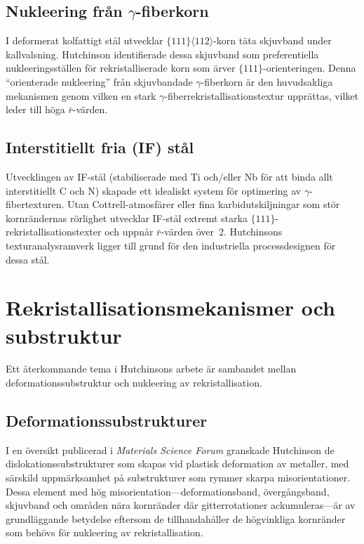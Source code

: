 \documentclass[11pt,a4paper]{article}
\begin{document}
\subsection{Nukleering fr\aa{}n $\gamma$-fiberkorn}

I deformerat kolfattigt st\aa{}l utvecklar
$\{111\}\langle 112\rangle$-korn t\"ata skjuvband under kallvalsning.
Hutchinson identifierade dessa skjuvband som preferentiella
nukleeringsst\"allen f\"or rekristalliserade korn som \"arver
$\{111\}$-orienteringen.  Denna ``orienterade nukleering'' fr\aa{}n
skjuvbandade $\gamma$-fiberkorn \"ar den huvudsakliga mekanismen genom
vilken en stark $\gamma$-fiberrekristallisationstextur uppr\"attas, vilket
leder till h\"oga $\bar{r}$-v\"arden.

\subsection{Interstitiellt fria (IF) st\aa{}l}

Utvecklingen av IF-st\aa{}l (stabiliserade med Ti och/eller Nb f\"or att
binda allt interstitiellt C och N) skapade ett idealiskt system f\"or
optimering av $\gamma$-fibertexturen.  Utan Cottrell-atmosf\"arer eller
fina karbidutskiljningar som st\"or kornr\"andernas r\"orlighet utvecklar
IF-st\aa{}l extremt starka $\{111\}$-rekristallisationstexter och
uppn\aa{}r $\bar{r}$-v\"arden \"over~2.  Hutchinsons texturanalys\-ramverk
ligger till grund f\"or den industriella processdesignen f\"or dessa
st\aa{}l.

\section{Rekristallisationsmekanismer och substruktur}
\label{sec:rex}

Ett \aa{}terkommande tema i Hutchinsons arbete \"ar sambandet mellan
deformationssubstruktur och nukleering av rekristallisation.

\subsection{Deformationssubstrukturer}

I en \"oversikt publicerad i \emph{Materials Science Forum}
\cite{Hutchinson2007MSF} granskade Hutchinson de dislokationssubstrukturer
som skapas vid plastisk deformation av metaller, med s\"arskild
uppm\"arksamhet p\aa{} substrukturer som rymmer skarpa
misorientationer.  Dessa element med h\"og misorientation---deformationsband,
\"overg\aa{}ngsband, skjuvband och omr\aa{}den n\"ara kornr\"ander d\"ar
gitterrotationer ackumuleras---\"ar av grundl\"aggande betydelse
eftersom de tillhandah\aa{}ller de h\"ogvinkliga kornr\"ander som beh\"ovs
f\"or nukleering av rekristallisation.
\end{document}
